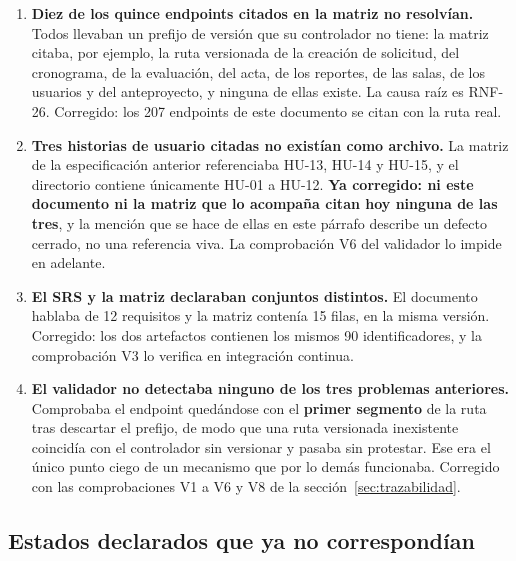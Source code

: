 \documentclass[11pt,a4paper]{article}
\begin{document}
\begin{enumerate}
    \item \textbf{Diez de los quince endpoints citados en la matriz no resolvían.} Todos
          llevaban un prefijo de versión que su controlador no tiene: la matriz citaba, por
          ejemplo, la ruta versionada de la creación de solicitud, del cronograma, de la
          evaluación, del acta, de los reportes, de las salas, de los usuarios y del
          anteproyecto, y ninguna de ellas existe. La causa raíz es RNF-26. Corregido: los 207
          endpoints de este documento se citan con la ruta real.
    \item \textbf{Tres historias de usuario citadas no existían como archivo.} La matriz de la
          especificación anterior referenciaba HU-13, HU-14 y HU-15, y el directorio contiene
          únicamente HU-01 a HU-12. \textbf{Ya corregido: ni este documento ni la matriz que lo
          acompaña citan hoy ninguna de las tres}, y la mención que se hace de ellas en este
          párrafo describe un defecto cerrado, no una referencia viva. La comprobación V6 del
          validador lo impide en adelante.
    \item \textbf{El SRS y la matriz declaraban conjuntos distintos.} El documento hablaba de 12
          requisitos y la matriz contenía 15 filas, en la misma versión. Corregido: los dos
          artefactos contienen los mismos 90 identificadores, y la comprobación V3 lo verifica en
          integración continua.
    \item \textbf{El validador no detectaba ninguno de los tres problemas anteriores.}
          Comprobaba el endpoint quedándose con el \textbf{primer segmento} de la ruta tras
          descartar el prefijo, de modo que una ruta versionada inexistente coincidía con el
          controlador sin versionar y pasaba sin protestar. Ese era el único punto ciego de un
          mecanismo que por lo demás funcionaba. Corregido con las comprobaciones V1 a V6 y V8
          de la sección~\ref{sec:trazabilidad}.
\end{enumerate}

\subsection{Estados declarados que ya no correspondían}
\end{document}
